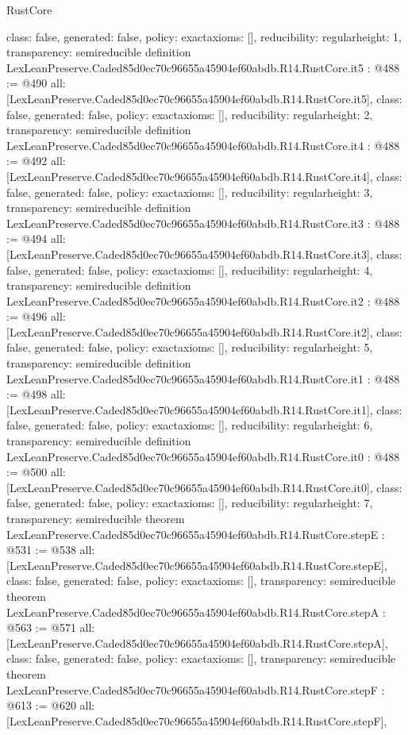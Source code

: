 \begin{lexlean}{RustCore}
\begin{coremodule}
{  class: false,
  generated: false,
  policy: exact{axioms: []},
  reducibility: regular{height: 1},
  transparency: semireducible
}
definition LexLeanPreserve.Caded85d0ec70c96655a45904ef60abdb.R14.RustCore.it5 : @488 := @490 {
  all: [LexLeanPreserve.Caded85d0ec70c96655a45904ef60abdb.R14.RustCore.it5],
  class: false,
  generated: false,
  policy: exact{axioms: []},
  reducibility: regular{height: 2},
  transparency: semireducible
}
definition LexLeanPreserve.Caded85d0ec70c96655a45904ef60abdb.R14.RustCore.it4 : @488 := @492 {
  all: [LexLeanPreserve.Caded85d0ec70c96655a45904ef60abdb.R14.RustCore.it4],
  class: false,
  generated: false,
  policy: exact{axioms: []},
  reducibility: regular{height: 3},
  transparency: semireducible
}
definition LexLeanPreserve.Caded85d0ec70c96655a45904ef60abdb.R14.RustCore.it3 : @488 := @494 {
  all: [LexLeanPreserve.Caded85d0ec70c96655a45904ef60abdb.R14.RustCore.it3],
  class: false,
  generated: false,
  policy: exact{axioms: []},
  reducibility: regular{height: 4},
  transparency: semireducible
}
definition LexLeanPreserve.Caded85d0ec70c96655a45904ef60abdb.R14.RustCore.it2 : @488 := @496 {
  all: [LexLeanPreserve.Caded85d0ec70c96655a45904ef60abdb.R14.RustCore.it2],
  class: false,
  generated: false,
  policy: exact{axioms: []},
  reducibility: regular{height: 5},
  transparency: semireducible
}
definition LexLeanPreserve.Caded85d0ec70c96655a45904ef60abdb.R14.RustCore.it1 : @488 := @498 {
  all: [LexLeanPreserve.Caded85d0ec70c96655a45904ef60abdb.R14.RustCore.it1],
  class: false,
  generated: false,
  policy: exact{axioms: []},
  reducibility: regular{height: 6},
  transparency: semireducible
}
definition LexLeanPreserve.Caded85d0ec70c96655a45904ef60abdb.R14.RustCore.it0 : @488 := @500 {
  all: [LexLeanPreserve.Caded85d0ec70c96655a45904ef60abdb.R14.RustCore.it0],
  class: false,
  generated: false,
  policy: exact{axioms: []},
  reducibility: regular{height: 7},
  transparency: semireducible
}
theorem LexLeanPreserve.Caded85d0ec70c96655a45904ef60abdb.R14.RustCore.stepE : @531 := @538 {
  all: [LexLeanPreserve.Caded85d0ec70c96655a45904ef60abdb.R14.RustCore.stepE],
  class: false,
  generated: false,
  policy: exact{axioms: []},
  transparency: semireducible
}
theorem LexLeanPreserve.Caded85d0ec70c96655a45904ef60abdb.R14.RustCore.stepA : @563 := @571 {
  all: [LexLeanPreserve.Caded85d0ec70c96655a45904ef60abdb.R14.RustCore.stepA],
  class: false,
  generated: false,
  policy: exact{axioms: []},
  transparency: semireducible
}
theorem LexLeanPreserve.Caded85d0ec70c96655a45904ef60abdb.R14.RustCore.stepF : @613 := @620 {
  all: [LexLeanPreserve.Caded85d0ec70c96655a45904ef60abdb.R14.RustCore.stepF],
}
\end{coremodule}
\end{lexlean}
